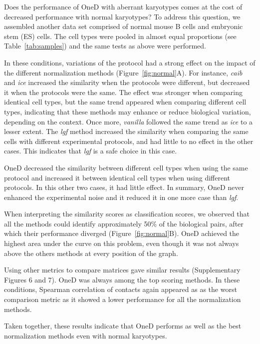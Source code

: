 \documentclass{bioinfo}
\begin{document}
Does the performance of OneD with aberrant karyotypes comes at the cost of
decreased performance with normal karyotypes? To address this question, we
assembled another data set comprised of normal mouse B cells and embryonic
stem (ES) cells. The cell types were pooled in almost equal proportions
(see Table~\ref{tab:samples}) and the same tests as above were performed.

In these conditions, variations of the protocol had a strong effect on the
impact of the different normalization methods (Figure~\ref{fig:normal}A).
For instance, \textit{caib} and \textit{ice} increased the similarity when
the protocols were different, but decreased it when the protocols were the
same. The effect was stronger when comparing identical cell types, but the
same trend appeared when comparing different cell types, indicating that
these methods may enhance or reduce biological variation, depending on the
context. Once more, \textit{vanilla} followed the same trend as
\textit{ice} to a lesser extent. The \textit{lgf} method increased the
similarity when comparing the same cells with different experimental
protocols, and had little to no effect in the other cases. This indicates
that \textit{lgf} is a safe choice in this case.

OneD decreased the similarity between different cell types when using the
same protocol and increased it between identical cell types when using
different protocols. In this other two cases, it had little effect. In
summary, OneD never enhanced the experimental noise and it reduced it in
one more case than \textit{lgf}.

When interpreting the similarity scores as classification scores, we
observed that all the methods could identify approximately 50\% of the
 biological pairs, after which their performance diverged
(Figure~\ref{fig:normal}B). OneD achieved the highest area under the curve
on this problem, even though it was not always above the others methods at
every position of the graph.

Using other metrics to compare matrices gave similar results
(Supplementary Figures 6 and 7). OneD was always among the top scoring
methods. In these conditions, Spearman correlation of contacts again
appeared as as the worst comparison metric as it showed a lower
performance for all the normalization methods.

Taken together, these results indicate that OneD performs as well as the
best normalization methods even with normal karyotypes.
\end{document}
